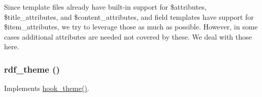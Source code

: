 Since template files already have built-\/in support for \$attributes, \$title\_\-attributes, and \$content\_\-attributes, and field templates have support for \$item\_\-attributes, we try to leverage those as much as possible. However, in some cases additional attributes are needed not covered by these. We deal with those here. \hypertarget{rdf_8module_a3a42c02c77fb57187a0e6376e8f5c4fd}{
\subsubsection[{rdf\_\-theme}]{\setlength{\rightskip}{0pt plus 5cm}rdf\_\-theme ()}}
\label{rdf_8module_a3a42c02c77fb57187a0e6376e8f5c4fd}
Implements \hyperlink{group__hooks_ga013ccb45c7aaab1c16cf9691428c910d}{hook\_\-theme()}. 